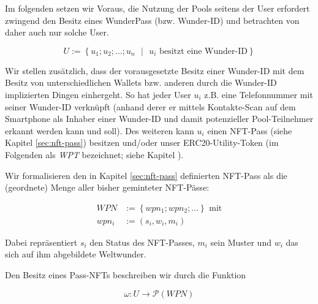 \begin{Def}\label{defPoolTeilnehmer}

Im folgenden setzen wir Voraus, die Nutzung der Pools seitens der User erfordert zwingend den Besitz eines WunderPass (bzw. Wunder-ID) und betrachten von daher auch nur solche User.

\begin{equation*}
  U := \left\{ u_1; u_2;...; u_{n} \text{ } | \text{ } u_i \text{ besitzt eine Wunder-ID} \right\}
\end{equation*}

\vspace{0.2cm}

Wir stellen zusätzlich, dass der vorausgesetzte Besitz einer Wunder-ID mit dem Besitz von unterschiedlichen Wallets bzw. anderen durch die Wunder-ID implizierten Dingen einhergeht. So hat jeder User $u_i$ z.B. eine Telefonnummer mit seiner Wunder-ID verknüpft (anhand derer er mittels Kontakte-Scan auf dem Smartphone als Inhaber einer Wunder-ID und damit potenzieller Pool-Teilnehmer erkannt werden kann und soll). Des weiteren kann $u_i$ einen NFT-Pass (siehe Kapitel \ref{sec:nft-pass}) besitzen und/oder unser ERC20-Utility-Token (im Folgenden als \textit{WPT} bezeichnet; siehe Kapitel ). 

\vspace{0.2cm}

Wir formalisieren den in Kapitel \ref{sec:nft-pass} definierten NFT-Pass als die (geordnete) Menge aller bisher geminteter NFT-Pässe:

\begin{align*}
  WPN &:= \left\{ wpn_1; wpn_2;... \right\} \text{ mit} \\
  wpn_i &:= (s_i, w_i, m_i)
\end{align*}

\vspace{0.2cm}

Dabei repräsentiert $s_i$ den Status des NFT-Passes, $m_i$ sein Muster und $w_i$ das sich auf ihm abgebildete Weltwunder.

\vspace{0.2cm}

Den Besitz eines Pass-NFTs beschreiben wir durch die Funktion 

\vspace{0.2cm}

\begin{equation*}
  \omega : U \rightarrow \mathcal{P} \left( WPN \right)  
\end{equation*}


\end{Def}
